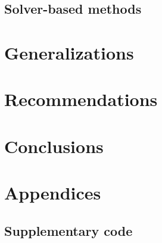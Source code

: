 \documentclass[11pt]{article}
\begin{document}
\subsection{Solver-based methods}
\label{section:solver-methods}


\section{Generalizations}
\label{section:generalization}


\section{Recommendations}
\label{section:recomendations}


\section{Conclusions}


% 

\newpage
\appendix
\section*{Appendices}
\renewcommand{\thesubsection}{\Alph{subsection}}

% 
% 
\subsection{Supplementary code}

\label{appedix:code}



\newpage
\printbibliography[heading=bibintoc, title={References}]
\end{document}
